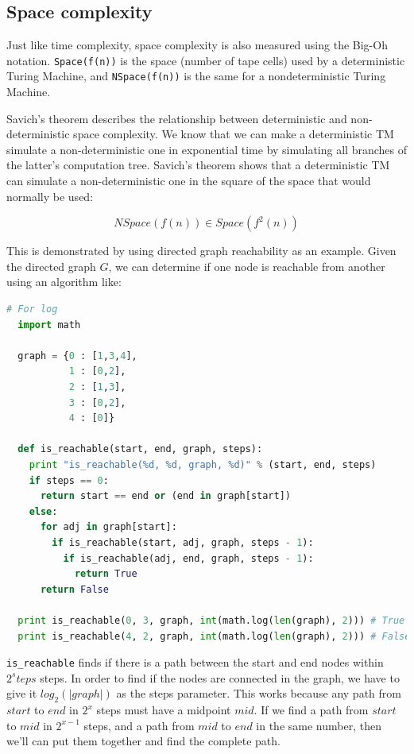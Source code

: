 \subsection{Space complexity}


Just like time complexity, space complexity is also measured using the Big-Oh
notation. \texttt{Space(f(n))} is the space (number of tape cells) used by a
deterministic Turing Machine, and \texttt{NSpace(f(n))} is the same for a
nondeterministic Turing Machine.

Savich's theorem describes the relationship between deterministic and non-
deterministic space complexity. We know that we can make a deterministic TM
simulate a non-deterministic one in exponential time by simulating all branches
of the latter's computation tree. Savich's theorem shows that a deterministic TM
can simulate a non-deterministic one in the square of the space that would
normally be used:


\[
  NSpace(f(n)) \in Space(f^2(n))
\]

This is demonstrated by using directed graph reachability as an example. Given
the directed graph $G$, we can determine if one node is reachable from another
using an algorithm like:

\begin{lstlisting}[language=python]
  # For log
  import math

  graph = {0 : [1,3,4],
           1 : [0,2],
           2 : [1,3],
           3 : [0,2],
           4 : [0]}

  def is_reachable(start, end, graph, steps):
    print "is_reachable(%d, %d, graph, %d)" % (start, end, steps)
    if steps == 0:
      return start == end or (end in graph[start])
    else:
      for adj in graph[start]:
        if is_reachable(start, adj, graph, steps - 1):
          if is_reachable(adj, end, graph, steps - 1):
            return True
      return False

  print is_reachable(0, 3, graph, int(math.log(len(graph), 2))) # True
  print is_reachable(4, 2, graph, int(math.log(len(graph), 2))) # False
\end{lstlisting}

\texttt{is\_reachable} finds if there is a path between the start and end nodes
within $2^steps$ steps. In order to find if the nodes are connected in the
graph, we have to give it $log_2(|graph|)$ as the steps parameter. This works
because any path from $start$ to $end$ in $2^x$ steps must have a midpoint
$mid$. If we find a path from $start$ to $mid$ in $2^{x - 1}$ steps, and a path
from $mid$ to $end$ in the same number, then we'll can put them together and
find the complete path.

